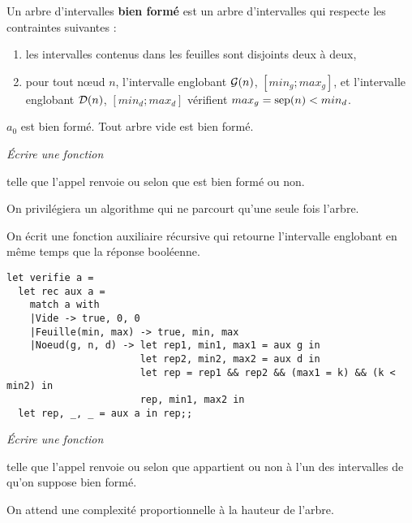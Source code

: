 Un arbre d'intervalles {\bf bien formé} est un arbre d'intervalles qui 
respecte les contraintes suivantes : 
\begin{enumerate}
    \item les intervalles contenus dans les feuilles sont disjoints 
    deux à deux,
    \item pour tout nœud $n$, l'intervalle englobant ${\cal G}(n)$, $[min_g; max_g]$, et l'intervalle englobant ${\cal D}(n)$, $[min_d; max_d]$ vérifient $max_g = \text{sep}(n) < min_d$.
\end{enumerate}
$a_0$ est bien formé. Tout arbre vide est bien formé.
\begin{Exercise}\it
Écrire une fonction 

telle que l'appel  renvoie  ou  selon que  est bien formé ou non.

On privilégiera  un algorithme qui ne parcourt qu'une seule fois l'arbre.
\end{Exercise}
\begin{Answer}
On écrit une fonction auxiliaire récursive qui retourne l'intervalle englobant en même temps que la réponse booléenne.
\begin{lstlisting}
let verifie a =
  let rec aux a = 
    match a with
    |Vide -> true, 0, 0
    |Feuille(min, max) -> true, min, max
    |Noeud(g, n, d) -> let rep1, min1, max1 = aux g in
                       let rep2, min2, max2 = aux d in
                       let rep = rep1 && rep2 && (max1 = k) && (k < min2) in
                       rep, min1, max2 in
  let rep, _, _ = aux a in rep;;
\end{lstlisting}
\end{Answer}
\begin{Exercise}\it
Écrire une fonction 

telle que l'appel  renvoie  ou  selon que  appartient ou non à l'un des intervalles de  qu'on suppose bien formé.

On attend une complexité proportionnelle à la hauteur de l'arbre.
\end{Exercise}
